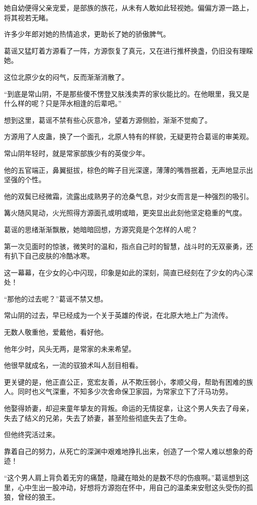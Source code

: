 \begin{this_body}
她自幼便得父亲宠爱，是部族的族花，从未有人敢如此轻视她。偏偏方源一路上，将其视若无睹。

许多少年郎对她的热情追求，更助长了她的骄傲脾气。

葛谣又猛盯着方源看了一阵，方源恢复了真元，又在进行推杯换盏，仍旧没有理睬她。

这位北原少女的闷气，反而渐渐消散了。

“到底是常山阴，不是那些傻不愣登又肤浅卖弄的家伙能比的。在他眼里，我又是什么样的呢？只是萍水相逢的后辈吧。”

想到这里，葛谣不禁有些心灰意冷，望着方源侧脸，渐渐不觉痴了。

方源用了人皮蛊，换了一个面孔，北原人特有的样貌，无疑更符合葛谣的审美观。

常山阴年轻时，就是常家部族少有的英俊少年。

他的五官端正，鼻翼挺拔，棕色的眸子目光深邃，薄薄的嘴唇抿着，无声地显示出坚强的个性。

他的双鬓已经微霜，流露出成熟男子的沧桑气息，对少女而言是一种强烈的吸引。

篝火随风晃动，火光照得方源面孔或明或暗，更突显出此刻他坚定稳重的气度。

葛谣的思绪渐渐飘散，她暗暗回想，方源究竟是个怎样的人呢？

第一次见面时的惊骇，微笑时的温和，指点自己时的智慧，战斗时的无双豪勇，还有扒下自己皮肤的冷酷冰寒。

这一幕幕，在少女的心中闪现，印象是如此的深刻，简直已经刻在了少女的内心深处！

“那他的过去呢？”葛谣不禁又想。

常山阴的过去，早已经成为一个关于英雄的传说，在北原大地上广为流传。

无数人敬重他，爱戴他，看好他。

他年少时，风头无两，是常家的未来希望。

他很早就成名，一流的驭狼术叫人刮目相看。

更关键的是，他正直公正，宽宏友善，从不欺压弱小，孝顺父母，帮助有困难的族人。同时也义气深重，不知多少次舍命保卫家园，为常家立下了汗马功劳。

他娶得娇妻，却迎来童年挚友的背叛。命运的无情捉拿，让这个男人失去了母亲，失去了结义的兄弟，失去了娇妻，甚至险些彻底失去了生命。

但他终究活过来。

靠着自己的努力，从死亡的深渊中艰难地挣扎出来，创造了一个常人难以想象的奇迹！

“这个男人肩上背负着无穷的痛楚，隐藏在暗处的是数不尽的伤痕啊。”葛谣想到这里，心中生出一股冲动，好想将方源抱在怀中，用自己的温柔来安慰这头受伤的孤狼，曾经的狼王。


\end{this_body}
